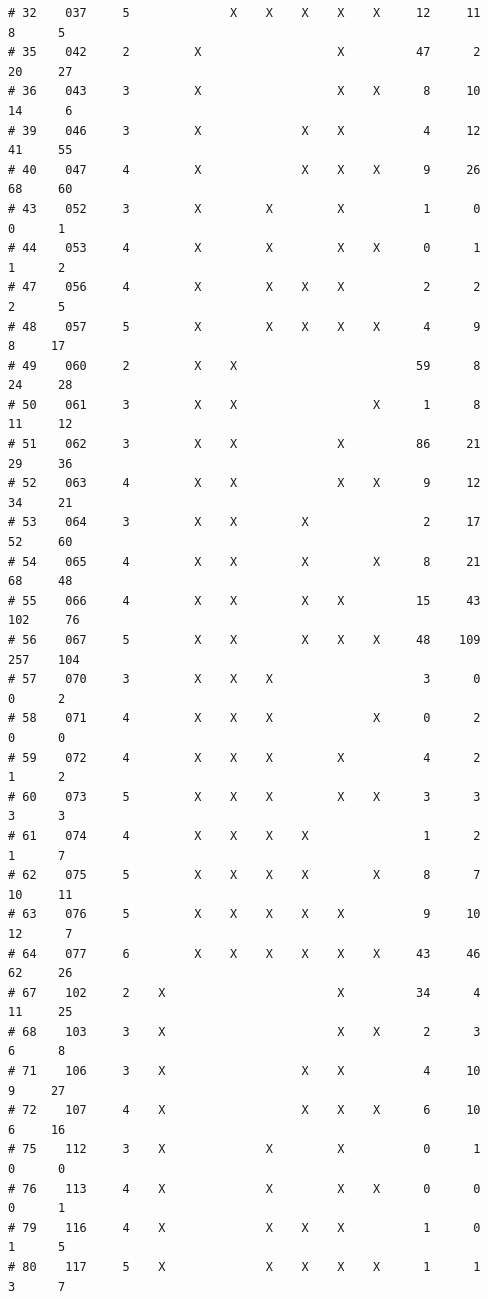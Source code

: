 \documentclass{article}\usepackage[]{graphicx}\usepackage[]{color}
\makeatletter
\newenvironment{kframe}{%
 \def\at@end@of@kframe{}%
 \ifinner\ifhmode%
  \def\at@end@of@kframe{\end{minipage}}%
  \begin{minipage}{\columnwidth}%
 \fi\fi%
 \def\FrameCommand##1{\hskip\@totalleftmargin \hskip-\fboxsep
 \colorbox{shadecolor}{##1}\hskip-\fboxsep
     \hskip-\linewidth \hskip-\@totalleftmargin \hskip\columnwidth}%
 \MakeFramed {\advance\hsize-\width
   \@totalleftmargin\z@ \linewidth\hsize
   \@setminipage}}%
 {\par\unskip\endMakeFramed%
 \at@end@of@kframe}
\newenvironment{knitrout}{}{} %
\makeatother
\begin{document}
\begin{knitrout}
\begin{kframe}
\begin{verbatim}
# 32    037     5              X    X    X    X    X     12     11      8      5
# 35    042     2         X                   X          47      2     20     27
# 36    043     3         X                   X    X      8     10     14      6
# 39    046     3         X              X    X           4     12     41     55
# 40    047     4         X              X    X    X      9     26     68     60
# 43    052     3         X         X         X           1      0      0      1
# 44    053     4         X         X         X    X      0      1      1      2
# 47    056     4         X         X    X    X           2      2      2      5
# 48    057     5         X         X    X    X    X      4      9      8     17
# 49    060     2         X    X                         59      8     24     28
# 50    061     3         X    X                   X      1      8     11     12
# 51    062     3         X    X              X          86     21     29     36
# 52    063     4         X    X              X    X      9     12     34     21
# 53    064     3         X    X         X                2     17     52     60
# 54    065     4         X    X         X         X      8     21     68     48
# 55    066     4         X    X         X    X          15     43    102     76
# 56    067     5         X    X         X    X    X     48    109    257    104
# 57    070     3         X    X    X                     3      0      0      2
# 58    071     4         X    X    X              X      0      2      0      0
# 59    072     4         X    X    X         X           4      2      1      2
# 60    073     5         X    X    X         X    X      3      3      3      3
# 61    074     4         X    X    X    X                1      2      1      7
# 62    075     5         X    X    X    X         X      8      7     10     11
# 63    076     5         X    X    X    X    X           9     10     12      7
# 64    077     6         X    X    X    X    X    X     43     46     62     26
# 67    102     2    X                        X          34      4     11     25
# 68    103     3    X                        X    X      2      3      6      8
# 71    106     3    X                   X    X           4     10      9     27
# 72    107     4    X                   X    X    X      6     10      6     16
# 75    112     3    X              X         X           0      1      0      0
# 76    113     4    X              X         X    X      0      0      0      1
# 79    116     4    X              X    X    X           1      0      1      5
# 80    117     5    X              X    X    X    X      1      1      3      7

\end{verbatim}
\end{kframe}
\end{knitrout}
\end{document}

